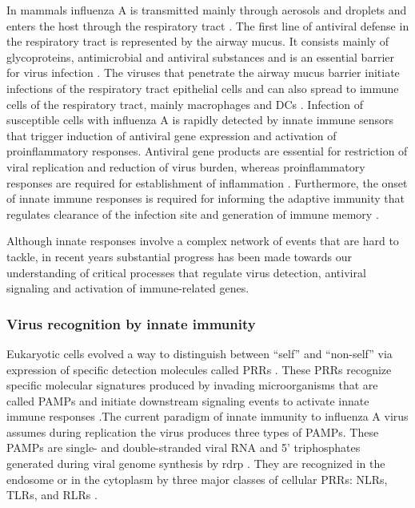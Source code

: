 	In mammals influenza A is transmitted mainly through aerosols and droplets and enters the host through the respiratory tract \parencite{Brankston2007}. The first line of antiviral defense in the respiratory tract is represented by the airway mucus. It consists mainly of glycoproteins, antimicrobial and antiviral substances and is an essential barrier for virus infection \parencite{Thornton2008, Nicholas2006}. The viruses that penetrate the airway mucus barrier initiate infections of the respiratory tract epithelial cells and can also spread to immune cells of the respiratory tract, mainly macrophages and \glspl{DC} \parencite{Perrone2008, Bender1998}. Infection of susceptible cells with influenza A is rapidly detected by innate immune sensors that trigger induction of antiviral gene expression and activation of proinflammatory responses. Antiviral gene products are essential for restriction of viral replication and reduction of virus burden, whereas proinflammatory responses are required for establishment of inflammation \parencite{Iwasaki2014}. Furthermore, the onset of innate immune responses is required for informing the adaptive immunity that regulates clearance of the infection site and generation of immune memory \parencite{Iwasaki2010}. 
	
	Although innate responses involve a complex network of events that are hard to tackle, in recent years substantial progress has been made towards our understanding of critical processes that regulate virus detection, antiviral signaling and activation of immune-related genes.
	
		\subsubsection{Virus recognition by innate immunity}
		
		Eukaryotic cells evolved a way to distinguish between ``self'' and ``non-self'' via expression of specific detection molecules called \glspl{PRR} \parencite{Janeway2002}. These \glspl{PRR} recognize specific molecular signatures produced by invading microorganisms that are called  \glspl{PAMP} and initiate downstream signaling events to activate innate immune responses \parencite{Janeway1989}.The current paradigm of innate immunity to influenza A virus assumes during replication the virus produces three types of  \glspl{PAMP}. These \glspl{PAMP} are single- and double-stranded viral RNA and 5' triphosphates generated during viral genome synthesis by \gls{rdrp} \parencite{Guillot2005, Hornung2006, Kato2006, Lund2004}. They are recognized in the endosome or in the cytoplasm by three major classes of cellular \glspl{PRR}: \glspl{NLR}, \glspl{TLR}, and \glspl{RLR} \parencite{Iwasaki2014}. 
		
